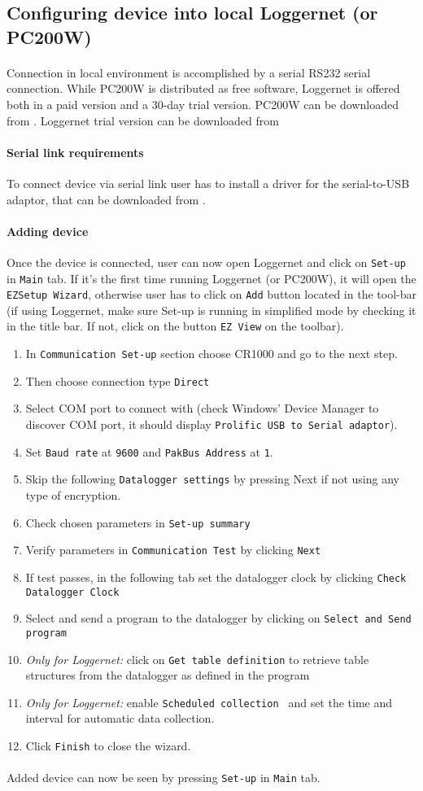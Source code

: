 \subsection{Configuring device into local Loggernet (or PC200W)}
\paragraph{}
Connection in local environment is accomplished by a serial RS232 serial connection. While PC200W is distributed as free software, Loggernet is offered both in a paid version and a 30-day trial version. PC200W can be downloaded from \cite{cs1}. Loggernet trial version can be downloaded from \cite{cs2}
\paragraph{Serial link requirements}
To connect device via serial link user has to install a driver for the serial-to-USB adaptor, that can be downloaded from \cite{prol1}. 
\paragraph{Adding device}
Once the device is connected, user can now open Loggernet and click on {\tt Set-up} in {\tt Main} tab. If it's the first time running Loggernet (or PC200W), it will open the {\tt EZSetup Wizard}, 
otherwise user has to click on {\tt Add} button located in the tool-bar (if using Loggernet, make sure Set-up is running in simplified mode by checking it in the title bar. If not, click on the button {\tt EZ View} on the toolbar).
\begin{enumerate}
	\item In {\tt Communication Set-up} section choose CR1000 and go to the next step.
	\item Then choose connection type {\tt Direct}
	\item Select COM port to connect with (check Windows' Device Manager to discover COM port, it should display {\tt Prolific USB to Serial adaptor}).
	\item Set {\tt Baud rate} at {\tt 9600} and {\tt PakBus Address} at {\tt 1}.
	\item Skip the following {\tt Datalogger settings} by pressing Next if not using any type of encryption.
	\item Check chosen parameters in {\tt Set-up summary}
	\item Verify parameters in {\tt Communication Test} by clicking {\tt Next}
	\item If test passes, in the following tab set the datalogger clock by clicking {\tt Check Datalogger Clock}
	\item Select and send a program to the datalogger by clicking on {\tt Select and Send program}
	\item \emph{Only for Loggernet:} click on {\tt Get table definition} to retrieve table structures from the datalogger as defined in the program
	\item \emph{Only for Loggernet:} enable {\tt Scheduled collection }  and set the time  and interval for automatic data collection.
	\item Click {\tt Finish} to close the wizard.
\end{enumerate}
\paragraph{}
Added device can now be seen by pressing {\tt Set-up} in {\tt Main} tab.